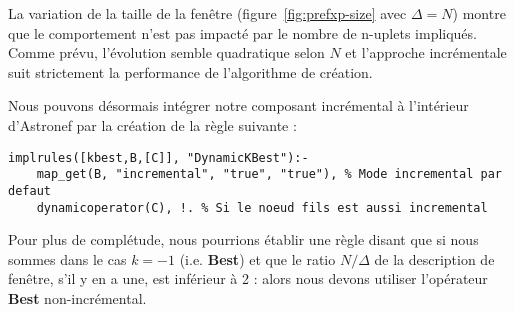 La variation de la taille de la fenêtre (figure~\ref{fig:prefxp-size} avec $\Delta=N$) montre que le comportement n'est pas impacté par le nombre de n-uplets impliqués. Comme prévu, l'évolution semble quadratique selon $N$ et l'approche incrémentale suit strictement la performance de l'algorithme de création.

Nous pouvons désormais intégrer notre composant incrémental à l'intérieur d'Astronef par la création de la règle suivante :
\begin{lstlisting}[language=PrologAstral]
implrules([kbest,B,[C]], "DynamicKBest"):- 
    map_get(B, "incremental", "true", "true"), % Mode incremental par defaut
    dynamicoperator(C), !. % Si le noeud fils est aussi incremental
\end{lstlisting}
Pour plus de complétude, nous pourrions établir une règle disant que si nous sommes dans le cas $k=-1$ (i.e. \textbf{Best}) et que le ratio $N/\Delta$ de la description de fenêtre, s'il y en a une, est inférieur à 2 : alors nous devons utiliser l'opérateur \textbf{Best} non-incrémental.
